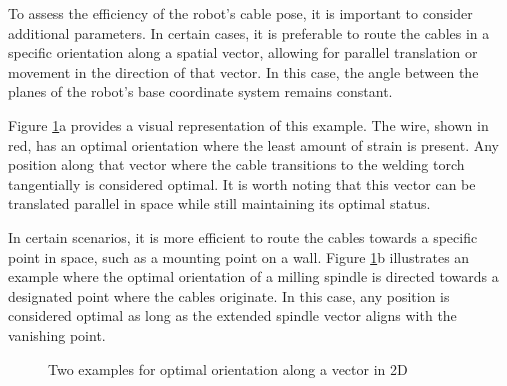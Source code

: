To assess the efficiency of the robot's cable pose, it is important to consider additional parameters. In certain cases, it is preferable to route the cables in a specific orientation along a spatial vector, allowing for parallel translation or movement in the direction of that vector. In this case, the angle between the planes of the robot's base coordinate system remains constant.

Figure \ref{OOPti}a provides a visual representation of this example. The wire, shown in red, has an optimal orientation where the least amount of strain is present. Any position along that vector where the cable transitions to the welding torch tangentially is considered optimal. It is worth noting that this vector can be translated parallel in space while still maintaining its optimal status.

In certain scenarios, it is more efficient to route the cables towards a specific point in space, such as a mounting point on a wall. Figure \ref{OOPti}b illustrates an example where the optimal orientation of a milling spindle is directed towards a designated point where the cables originate. In this case, any position is considered optimal as long as the extended spindle vector aligns with the vanishing point.


\begin{figure}[H]%
	\centering
	\qquad
	\caption{Two examples for optimal orientation along a vector in 2D}%
	\label{OOPti}%
\end{figure}



